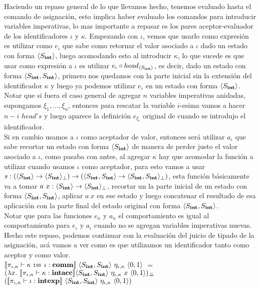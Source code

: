 Haciendo un repaso general de lo que llevamos hecho, tenemos evaluado hasta el comando
de asignaci\'on, esto implica haber evaluado los comandos para introducir variables 
imperativas, lo mas importante a repasar es los pares aceptor-evaluador de los
identificadores $\iota$ y $\kappa$. Empezando con $\iota$, vemos que usarlo como
expresi\'on es utilizar como $e_\iota$ que
sabe como retornar el valor asociado a $\iota$ dado un estado con forma $\langle S_{\textbf{int}} \rangle$,
luego acomodando esto al introducir $\kappa$, lo que sucede es que usar como expresi\'on
a $\iota$ es utilizar $e_\iota \circ head_{\langle S_{\textbf{int}} \rangle}$, es decir, dado
un estado con forma $\langle S_{\textbf{int}}, S_{\textbf{int}} \rangle$, primero nos quedamos con la
parte inicial sin la extensi\'on del identificador $\kappa$ y luego ya podemos
utilizar $e_\iota$ en un estado con forma $\langle S_{\textbf{int}} \rangle$. Notar que
si fuera el caso general de agregar $n$ variables imperativas anidadas, supongamos
$\xi_1,\ldots,\xi_n$, entonces para rescatar
la variable $i$-esima vamos a hacer $n-i$ $head's$ y luego aparece la definici\'on
$e_{\xi_i}$ original de cuando se introdujo el identificador.\\
Si en cambio usamos a $\iota$ como aceptador de valor, entonces ser\'a utilizar
$a_\iota$ que sabe recortar un estado con forma $\langle S_{\textbf{int}} \rangle$ de manera
de perder justo el valor asociado a $\iota$, como pasaba con antes, al agregar
$\kappa$ hay que acomodar la funci\'on a utilizar cuando usamos $\iota$ como aceptador,
para esto vamos a usar 
$s : (\langle S_{\textbf{int}} \rangle \rightarrow \langle S_{\textbf{int}} \rangle_{\bot})
	 \rightarrow 
	 (\langle S_{\textbf{int}},S_{\textbf{int}} \rangle \rightarrow \langle S_{\textbf{int}},S_{\textbf{int}} \rangle_{\bot})$, esta
funci\'on b\'asicamente va a tomar $a \ x : \langle S_{\textbf{int}} \rangle \rightarrow \langle S_{\textbf{int}} \rangle_{\bot}$,
recortar un la parte inicial de un estado con forma $\langle S_{\textbf{int}},S_{\textbf{int}} \rangle$, aplicar
$a \ x$ en ese estado y luego concatenar el resultado de esa aplicaci\'on con la parte
final del estado original con forma $\langle S_{\textbf{int}},S_{\textbf{int}} \rangle$.\\
Notar que para las funciones $e_\kappa$ y $a_\kappa$ el comportamiento es igual
al comportamiento para $e_\iota$ y $a_\iota$ cuando no se agregan variables imperativas 
nuevas. Hecho este repaso, podemos continuar con la evaluaci\'on del juicio de tipado
de la asignaci\'on, ac\'a vamos a ver como es que utilizamos un identificador 
tanto como aceptor y como valor.\\

$\llbracket \pi_{\iota,\kappa} \vdash \kappa \ \textbf{:=} \ \iota: \textbf{comm} \rrbracket
		\ \langle S_{\textbf{int}},S_{\textbf{int}} \rangle \ \eta_{\iota,\kappa}
		\ \langle 0,1 \rangle$ $=$\\
\indent \indent \indent \indent
$(\lambda x . \ \llbracket \pi_{\iota,\kappa} \vdash \kappa : \textbf{intacc} \rrbracket
	\langle S_{\textbf{int}},S_{\textbf{int}} \rangle 
	\ \eta_{\iota,\kappa}
	\ x \ \langle 0,1 \rangle)_{\bot \!\!\! \bot}$\\
\indent \indent \indent \indent \indent \indent \indent \indent
$(\llbracket  \pi_{\iota,\kappa} \vdash \iota : \textbf{intexp}  \rrbracket 
	\ \langle S_{\textbf{int}},S_{\textbf{int}} \rangle
	\ \eta_{\iota,\kappa} 
	\ \langle 0,1 \rangle)$\\
	
